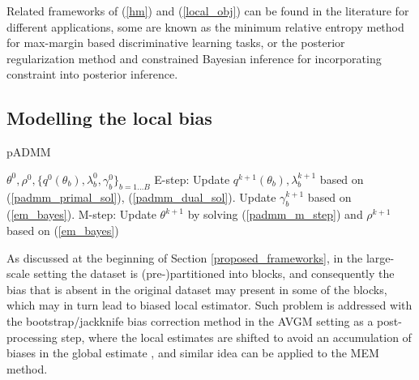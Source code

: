 \documentclass{article}
\newcommand{\1}[0]{\ensuremath{\boldsymbol{1}}\xspace}
\begin{document}
Related frameworks of (\ref{hm}) and (\ref{local_obj}) can be found in the literature for different applications, some are known as the minimum relative entropy method \cite{Jaakkola1999, Zhu2012} for max-margin based discriminative learning tasks, or the posterior regularization method \cite{Ganchev2010} and constrained Bayesian inference \cite{Koyejo2013} for incorporating constraint into posterior inference.

\subsection{Modelling the local bias}\label{pADMM}

\begin{algorithm}[tb]
   \caption{pADMM}
   \label{alg:pADMM}
\begin{algorithmic}
    $\theta^0, \rho^0, \{q^0(\theta_b), \lambda_b^0, \gamma_b^0\}_{b=1\ldots B}$
   \STATE E-step: 
   \STATE Update $q^{k+1}(\theta_b), \lambda_b^{k+1}$ based on (\ref{padmm_primal_sol}), (\ref{padmm_dual_sol}).
   \STATE Update $\gamma_b^{k+1}$ based on (\ref{em_bayes}).
   \ENDFOR
   \STATE M-step:
   \STATE Update $\theta^{k+1}$ by solving (\ref{padmm_m_step}) and $\rho^{k+1}$ based on (\ref{em_bayes})
   \ENDFOR
\end{algorithmic}
\end{algorithm}

As discussed at the beginning of Section \ref{proposed_frameworks}, in the large-scale setting the dataset is (pre-)partitioned into blocks, and consequently the bias that is absent in the original dataset may present in some of the blocks, which may in turn lead to biased local estimator. Such problem is addressed with the bootstrap/jackknife bias correction method in the AVGM setting as a post-processing step, where the local estimates are shifted to avoid an accumulation of biases in the global estimate \cite{YZhang2012, Scott2013}, and similar idea can be applied to the MEM method.
\end{document}
